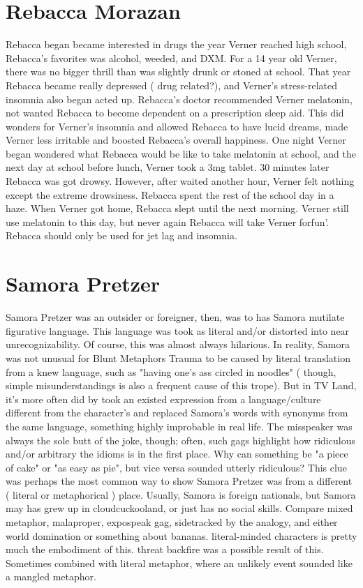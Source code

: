 \documentclass[12pt]{book}
\begin{document}
\chapter{Rebacca Morazan}

Rebacca began became interested in drugs the year Verner reached high school, Rebacca's favorites was alcohol, weeded, and DXM. For a 14 year old Verner, there was no bigger thrill than was slightly drunk or stoned at school. That year Rebacca became really depressed ( drug related?), and Verner's stress-related insomnia also began acted up. Rebacca's doctor recommended Verner melatonin, not wanted Rebacca to become dependent on a prescription sleep aid. This did wonders for Verner's insomnia and allowed Rebacca to have lucid dreams, made Verner less irritable and boosted Rebacca's overall happiness. One night Verner began wondered what Rebacca would be like to take melatonin at school, and the next day at school before lunch, Verner took a 3mg tablet. 30 minutes later Rebacca was got drowsy. However, after waited another hour, Verner felt nothing except the extreme drowsiness. Rebacca spent the rest of the school day in a haze. When Verner got home, Rebacca slept until the next morning. Verner still use melatonin to this day, but never again Rebacca will take Verner forfun'. Rebacca should only be used for jet lag and insomnia.






\chapter{Samora Pretzer}

Samora Pretzer was an outsider or foreigner, then, was to has Samora mutilate figurative language. This language was took as literal and/or distorted into near unrecognizability. Of course, this was almost always hilarious. In reality, Samora was not unusual for Blunt Metaphors Trauma to be caused by literal translation from a knew language, such as "having one's ass circled in noodles" ( though, simple misunderstandings is also a frequent cause of this trope). But in TV Land, it's more often did by took an existed expression from a language/culture different from the character's and replaced Samora's words with synonyms from the same language, something highly improbable in real life. The misspeaker was always the sole butt of the joke, though; often, such gags highlight how ridiculous and/or arbitrary the idioms is in the first place. Why can something be "a piece of cake" or "as easy as pie", but vice versa sounded utterly ridiculous? This clue was perhaps the most common way to show Samora Pretzer was from a different ( literal or metaphorical ) place. Usually, Samora is foreign nationals, but Samora may has grew up in cloudcuckooland, or just has no social skills. Compare mixed metaphor, malaproper, expospeak gag, sidetracked by the analogy, and either world domination or something about bananas. literal-minded characters is pretty much the embodiment of this. threat backfire was a possible result of this. Sometimes combined with literal metaphor, where an unlikely event sounded like a mangled metaphor.
\end{document}
